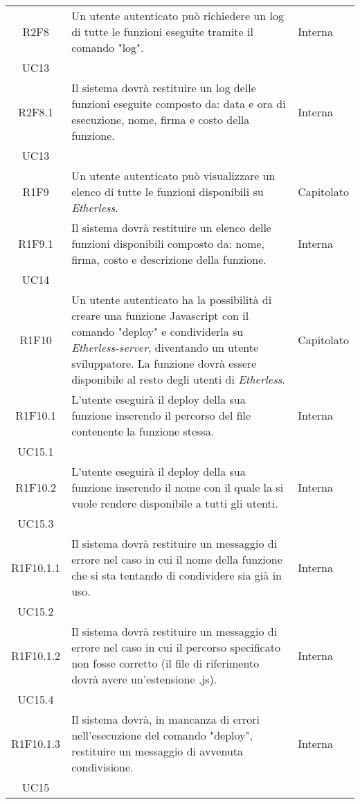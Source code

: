 \begin{longtable}{|c|p{8cm}|C{2cm}|}
	R2F8 &  Un utente autenticato può richiedere un log di tutte le funzioni eseguite tramite il comando "log". & \centering Interna \\ UC13 \tabularnewline
	
	R2F8.1 &  Il sistema dovrà restituire un log delle funzioni eseguite composto da: data e ora di esecuzione, nome, firma e costo della funzione. & \centering Interna \\ UC13 \tabularnewline
	
	R1F9 &  Un utente autenticato può visualizzare un elenco di tutte le funzioni disponibili su \textit{Etherless}. & Capitolato \\	
	
	R1F9.1 &  Il sistema dovrà restituire un elenco delle funzioni disponibili composto da: nome, firma, costo e descrizione della funzione. & \centering Interna \\ UC14 \tabularnewline
	
	R1F10 &  Un utente autenticato ha la possibilità di creare una funzione Javascript con il comando "deploy" e condividerla su \textit{Etherless-server}, diventando un utente sviluppatore. La funzione dovrà essere disponibile al resto degli utenti di \textit{Etherless}. & Capitolato \\
	
	R1F10.1 &  L'utente eseguirà il deploy della sua funzione inserendo il percorso del file contenente la funzione stessa. & \centering Interna \\ UC15.1 \tabularnewline
	
	R1F10.2 &  L'utente eseguirà il deploy della sua funzione inserendo il nome con il quale la si vuole rendere disponibile a tutti gli utenti. & \centering Interna \\ UC15.3 \tabularnewline
	
	R1F10.1.1 &  Il sistema dovrà restituire un messaggio di errore nel caso in cui il nome della funzione che si sta tentando di condividere sia già in uso. & \centering Interna \\ UC15.2 \tabularnewline
	
	R1F10.1.2 &  Il sistema dovrà restituire un messaggio di errore nel caso in cui il percorso specificato non fosse corretto (il file di riferimento dovrà avere un'estensione .js). & \centering Interna \\ UC15.4 \tabularnewline
	
	R1F10.1.3 &  Il sistema dovrà, in mancanza di errori nell'esecuzione del comando "deploy", restituire un messaggio di avvenuta condivisione. & \centering Interna \\ UC15 \tabularnewline
	

\end{longtable}
